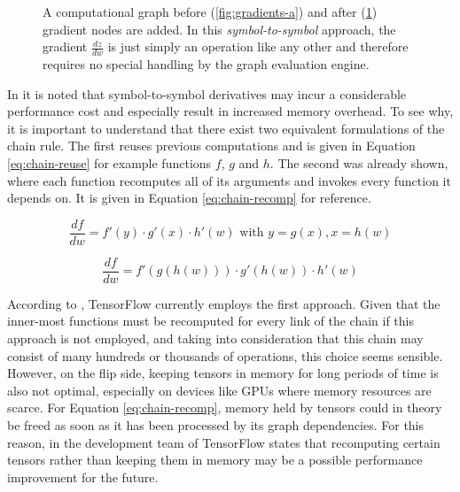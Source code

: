 \begin{figure}
\begin{subfigure}[b]{0.2\textwidth}
    \caption{}
    \label{fig:gradients-b}
  \end{subfigure}
  \label{fig:gradients}
  \caption{A computational graph before (\ref{fig:gradients-a}) and after
    (\ref{fig:gradients-b}) gradient nodes are added. In this
    \emph{symbol-to-symbol} approach, the gradient $\frac{dz}{dw}$ is just
    simply an operation like any other and therefore requires no special
    handling by the graph evaluation engine.}
\end{figure}

In \cite{tensorflow} it is noted that symbol-to-symbol derivatives may incur a
considerable performance cost and especially result in increased memory
overhead. To see why, it is important to understand that there exist two
equivalent formulations of the chain rule. The first reuses previous
computations and is given in Equation \ref{eq:chain-reuse} for example functions
$f$, $g$ and $h$. The second was already shown, where each function recomputes
all of its arguments and invokes every function it depends on. It is given in
Equation \ref{eq:chain-recomp} for reference.

\begin{equation}\label{eq:chain-reuse}
  \frac{d f}{d w} = f'(y) \cdot g'(x) \cdot h'(w) \text{ with } y = g(x), x =
  h(w)
\end{equation}

\begin{equation}\label{eq:chain-recomp}
  \frac{d f}{d w} = f'(g(h(w))) \cdot g'(h(w)) \cdot h'(w)
\end{equation}

According to \cite{tensorflow}, TensorFlow currently employs the first
approach. Given that the inner-most functions must be recomputed for every link
of the chain if this approach is not employed, and taking into consideration
that this chain may consist of many hundreds or thousands of operations, this
choice seems sensible. However, on the flip side, keeping tensors in memory for
long periods of time is also not optimal, especially on devices like GPUs where
memory resources are scarce. For Equation \ref{eq:chain-recomp}, memory held by
tensors could in theory be freed as soon as it has been processed by its graph
dependencies. For this reason, in \cite{tensorflow} the development team of
TensorFlow states that recomputing certain tensors rather than keeping them in
memory may be a possible performance improvement for the future.

